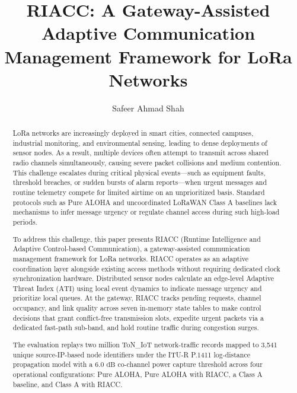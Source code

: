\documentclass[preprint,review,12pt]{elsarticle}
\begin{document}
\begin{frontmatter}

\title{RIACC: A Gateway-Assisted Adaptive Communication Management Framework for LoRa Networks}

\author[inst1]{Safeer Ahmad Shah}


\begin{abstract}
LoRa networks are increasingly deployed in smart cities, connected campuses, industrial monitoring, and environmental sensing, leading to dense deployments of sensor nodes. As a result, multiple devices often attempt to transmit across shared radio channels simultaneously, causing severe packet collisions and medium contention. This challenge escalates during critical physical events—such as equipment faults, threshold breaches, or sudden bursts of alarm reports—when urgent messages and routine telemetry compete for limited airtime on an unprioritized basis. Standard protocols such as Pure ALOHA and uncoordinated LoRaWAN Class A baselines lack mechanisms to infer message urgency or regulate channel access during such high-load periods.

To address this challenge, this paper presents RIACC (Runtime Intelligence and Adaptive Control-based Communication), a gateway-assisted communication management framework for LoRa networks. RIACC operates as an adaptive coordination layer alongside existing access methods without requiring dedicated clock synchronization hardware. Distributed sensor nodes calculate an edge-level Adaptive Threat Index ($\text{ATI}$) using local event dynamics to indicate message urgency and prioritize local queues. At the gateway, RIACC tracks pending requests, channel occupancy, and link quality across seven in-memory state tables to make control decisions that grant conflict-free transmission slots, expedite urgent packets via a dedicated fast-path sub-band, and hold routine traffic during congestion surges.

The evaluation replays two million ToN\_IoT network-traffic records mapped to 3,541 unique source-IP-based node identifiers under the ITU-R P.1411 log-distance propagation model with a $6.0\text{ dB}$ co-channel power capture threshold across four operational configurations: Pure ALOHA, Pure ALOHA with RIACC, a Class A baseline, and Class A with RIACC.


\end{abstract}
\end{frontmatter}
\end{document}
